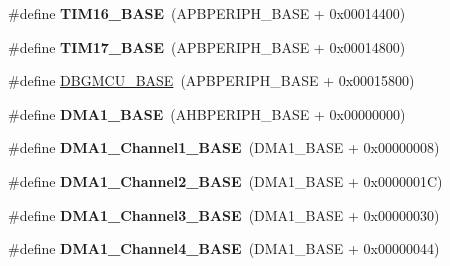 \begin{DoxyCompactItemize}
\item 
\mbox{\label{group___peripheral__memory__map_ga16c97093a531d763b0794c3e6d09e1bf}} 
\#define {\bfseries T\+I\+M16\+\_\+\+B\+A\+SE}~(A\+P\+B\+P\+E\+R\+I\+P\+H\+\_\+\+B\+A\+SE + 0x00014400)
\item 
\mbox{\label{group___peripheral__memory__map_gaffbedbe30e8c4cffdea326d6c1800574}} 
\#define {\bfseries T\+I\+M17\+\_\+\+B\+A\+SE}~(A\+P\+B\+P\+E\+R\+I\+P\+H\+\_\+\+B\+A\+SE + 0x00014800)
\item 
\#define \hyperlink{group___peripheral__memory__map_ga4adaf4fd82ccc3a538f1f27a70cdbbef}{D\+B\+G\+M\+C\+U\+\_\+\+B\+A\+SE}~(A\+P\+B\+P\+E\+R\+I\+P\+H\+\_\+\+B\+A\+SE + 0x00015800)
\item 
\mbox{\label{group___peripheral__memory__map_gab2d8a917a0e4ea99a22ac6ebf279bc72}} 
\#define {\bfseries D\+M\+A1\+\_\+\+B\+A\+SE}~(A\+H\+B\+P\+E\+R\+I\+P\+H\+\_\+\+B\+A\+SE + 0x00000000)
\item 
\mbox{\label{group___peripheral__memory__map_ga888dbc1608243badeb3554ffedc7364c}} 
\#define {\bfseries D\+M\+A1\+\_\+\+Channel1\+\_\+\+B\+A\+SE}~(D\+M\+A1\+\_\+\+B\+A\+SE + 0x00000008)
\item 
\mbox{\label{group___peripheral__memory__map_ga38a70090eef3687e83fa6ac0c6d22267}} 
\#define {\bfseries D\+M\+A1\+\_\+\+Channel2\+\_\+\+B\+A\+SE}~(D\+M\+A1\+\_\+\+B\+A\+SE + 0x0000001\+C)
\item 
\mbox{\label{group___peripheral__memory__map_ga70b3d9f36ca9ce95b4e421c11154fe5d}} 
\#define {\bfseries D\+M\+A1\+\_\+\+Channel3\+\_\+\+B\+A\+SE}~(D\+M\+A1\+\_\+\+B\+A\+SE + 0x00000030)
\item 
\mbox{\label{group___peripheral__memory__map_ga1adc93cd0baf0897202c71110e045692}} 
\#define {\bfseries D\+M\+A1\+\_\+\+Channel4\+\_\+\+B\+A\+SE}~(D\+M\+A1\+\_\+\+B\+A\+SE + 0x00000044)
\item 
\mbox{\label{group___peripheral__memory__map_gac041a71cd6c1973964f847a68aa14478}} 

\end{DoxyCompactItemize}
